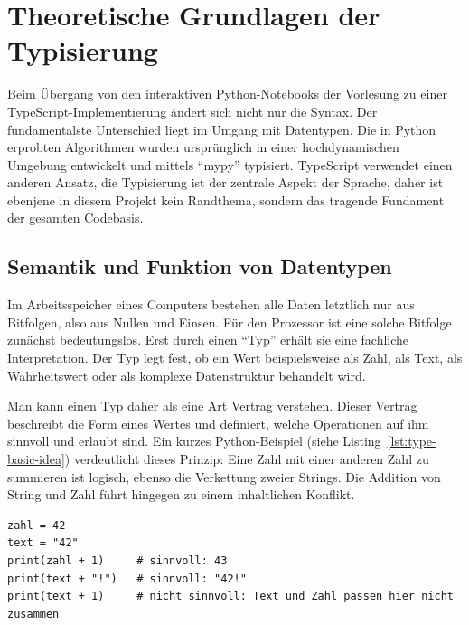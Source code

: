 
\section{Theoretische Grundlagen der Typisierung}
\label{sec:typisierung}

Beim Übergang von den interaktiven Python-Notebooks der Vorlesung zu einer TypeScript-Implementierung ändert sich nicht nur die Syntax. Der fundamentalste Unterschied liegt im Umgang mit Datentypen. Die in Python erprobten Algorithmen wurden ursprünglich in einer hochdynamischen Umgebung entwickelt und mittels \enquote{mypy} typisiert. TypeScript verwendet einen anderen Ansatz, die Typisierung ist der zentrale Aspekt der Sprache, daher ist ebenjene in diesem Projekt kein Randthema, sondern das tragende Fundament der gesamten Codebasis.

\subsection{Semantik und Funktion von Datentypen}
\label{subsec:was-ist-ein-typ}

Im Arbeitsspeicher eines Computers bestehen alle Daten letztlich nur aus Bitfolgen, also aus Nullen und Einsen. Für den Prozessor ist eine solche Bitfolge zunächst bedeutungslos. Erst durch einen \enquote{Typ} erhält sie eine fachliche Interpretation. Der Typ legt fest, ob ein Wert beispielsweise als Zahl, als Text, als Wahrheitswert oder als komplexe Datenstruktur behandelt wird.

Man kann einen Typ daher als eine Art Vertrag verstehen. Dieser Vertrag beschreibt die Form eines Wertes und definiert, welche Operationen auf ihm sinnvoll und erlaubt sind. Ein kurzes Python-Beispiel (siehe Listing~\ref{lst:type-basic-idea}) verdeutlicht dieses Prinzip: Eine Zahl mit einer anderen Zahl zu summieren ist logisch, ebenso die Verkettung zweier Strings. Die Addition von String und Zahl führt hingegen zu einem inhaltlichen Konflikt.

\begin{listing}[htbp]
    \caption{Unterschiedliche Operationen erfordern unterschiedliche Typen}
    \label{lst:type-basic-idea}
    \begin{verbatim}
zahl = 42
text = "42"
print(zahl + 1)     # sinnvoll: 43
print(text + "!")   # sinnvoll: "42!"
print(text + 1)     # nicht sinnvoll: Text und Zahl passen hier nicht zusammen
    \end{verbatim}
\end{listing}

